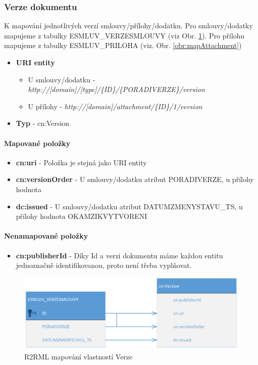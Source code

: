 \subsubsection{Verze dokumentu}

K mapování jednotlivých verzí smlouvy/přílohy/dodatku. Pro smlouvy/dodatky mapujeme z tabulky ESMLUV\_VERZESMLOUVY (viz Obr. \ref{obr:mapVersion}). Pro přílohu mapujeme z tabulky ESMLUV\_PRILOHA (viz. Obr. \ref{obr:mapAttachment})

\begin{itemize}
\item \textbf{URI entity}
	\begin{itemize}
	\item U smlouvy/dodatku - \\\textit{http://[domain]/[type]/\{ID\}/\{PORADIVERZE\}/version}
	\item U přílohy - \textit{http://[domain]/attachment/\{ID\}/1/version}
	\end{itemize}
\item \textbf{Typ} - cn:Version
\end{itemize}

\paragraph*{Mapované položky}
\begin{itemize}
\item \textbf{cn:uri} - Položka je stejná jako URI entity
\item \textbf{cn:versionOrder} - U smlouvy/dodatku atribut PORADIVERZE, u přílohy hodnota 
\item \textbf{dc:issued} - U smlouvy/dodatku atribut DATUMZMENYSTAVU\_TS, u přílohy hodnota OKAMZIKVYTVORENI
\end{itemize}

\paragraph*{Nenamapované položky}
\begin{itemize}
\item \textbf{cn:publisherId} - Díky Id a verzi dokumentu máme každou entitu jednoznačně identifikovanou, proto není třeba vyplňovat.
\end{itemize}

\begin{figure}[H]
\centerline{\includegraphics[width=\textwidth]{img/mapVersion.eps}}
\caption{R2RML mapování vlastností Verze}
\label{obr:mapVersion}
\end{figure}

